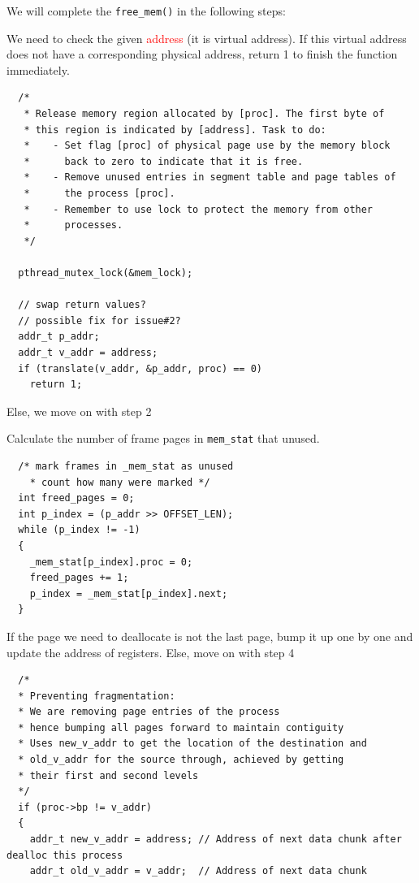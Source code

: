 \documentclass[a4paper]{article}
\numberwithin{equation}{section}
\begin{document}
We will complete the \texttt{free_mem()} in the following steps:
\begin{steps}
  \item We need to check the given \textcolor{red}{ address} (it is virtual address).
  If this virtual address does not have a corresponding physical address, return 1 to finish the function immediately.
  \begin{mdframed}[leftline=false,rightline=false,backgroundcolor=magenta!10,nobreak=false]
    \begin{verbatim}
  /*
   * Release memory region allocated by [proc]. The first byte of
   * this region is indicated by [address]. Task to do:
   * 	- Set flag [proc] of physical page use by the memory block
   * 	  back to zero to indicate that it is free.
   * 	- Remove unused entries in segment table and page tables of
   * 	  the process [proc].
   * 	- Remember to use lock to protect the memory from other
   * 	  processes.
   */

  pthread_mutex_lock(&mem_lock);

  // swap return values?
  // possible fix for issue#2?
  addr_t p_addr;
  addr_t v_addr = address;
  if (translate(v_addr, &p_addr, proc) == 0)
    return 1;
    \end{verbatim}
  \end{mdframed}
  Else, we move on with step 2

  \item Calculate the number of frame pages in \texttt{mem_stat} that unused. %
  \begin{mdframed}[leftline=false,rightline=false,backgroundcolor=magenta!10,nobreak=false]
    \begin{verbatim}
  /* mark frames in _mem_stat as unused
    * count how many were marked */
  int freed_pages = 0;
  int p_index = (p_addr >> OFFSET_LEN);
  while (p_index != -1)
  {
    _mem_stat[p_index].proc = 0;
    freed_pages += 1;
    p_index = _mem_stat[p_index].next;
  }
    \end{verbatim}
  \end{mdframed}

  \item If the page we need to deallocate is not the last page, bump it up one by one and update the address of registers. %
  Else, move on with step 4
  \begin{mdframed}[leftline=false,rightline=false,backgroundcolor=magenta!10,nobreak=false]
    \begin{verbatim}
  /*
  * Preventing fragmentation:
  * We are removing page entries of the process
  * hence bumping all pages forward to maintain contiguity
  * Uses new_v_addr to get the location of the destination and
  * old_v_addr for the source through, achieved by getting
  * their first and second levels
  */
  if (proc->bp != v_addr)
  {
    addr_t new_v_addr = address; // Address of next data chunk after dealloc this process
    addr_t old_v_addr = v_addr;  // Address of next data chunk


\end{verbatim}
\end{mdframed}
\end{steps}
\end{document}
